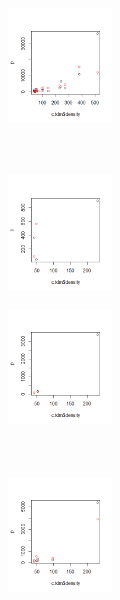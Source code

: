 \documentclass[10pt,a4paper]{article}
\begin{document}
\begin{figure}[t!]
    \centering
    \begin{subfigure}[t]{0.5\textwidth}
        \centering
        \includegraphics[height=1.2in]{pictures/Modell_1/repeat = 30/image_30-4/Rplot}
    \end{subfigure}%
    ~ 
    \begin{subfigure}[t]{0.5\textwidth}
        \centering
        \includegraphics[height=1.2in]{pictures/Modell_1/repeat = 30/image_30-4/Rplot01}
    \end{subfigure}
\end{figure}

\begin{figure}[t!]
    \centering
    \begin{subfigure}[t]{0.5\textwidth}
        \centering
        \includegraphics[height=1.2in]{pictures/Modell_1/repeat = 30/image_30-5/Rplot}
    \end{subfigure}%
    ~ 
    \begin{subfigure}[t]{0.5\textwidth}
        \centering
        \includegraphics[height=1.2in]{pictures/Modell_1/repeat = 30/image_30-5/Rplot01}
    \end{subfigure}
\end{figure}
\end{document}
